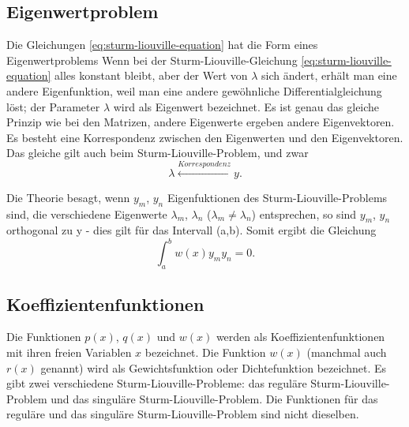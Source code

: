 \subsection{Eigenwertproblem}
Die Gleichungen \ref{eq:sturm-liouville-equation} hat die Form eines Eigenwertproblems
Wenn bei der Sturm-Liouville-Gleichung \ref{eq:sturm-liouville-equation} alles  konstant bleibt, aber der Wert von $\lambda$ sich ändert, erhält man eine andere Eigenfunktion, weil man eine andere gewöhnliche Differentialgleichung löst;
der Parameter $\lambda$ wird als Eigenwert bezeichnet.
Es ist genau das gleiche Prinzip wie bei den Matrizen, andere Eigenwerte ergeben andere Eigenvektoren.
Es besteht eine Korrespondenz zwischen den Eigenwerten und den Eigenvektoren.
Das gleiche gilt auch beim Sturm-Liouville-Problem, und zwar
\begin{equation}
	\lambda \overset{Korrespondenz}\leftrightarrow y.
\end{equation}

Die Theorie besagt, wenn $y_m$, $y_n$ Eigenfuktionen des Sturm-Liouville-Problems sind, die verschiedene Eigenwerte $\lambda_m$, $\lambda_n$ ($\lambda_m \neq \lambda_n$) entsprechen, so sind $y_m$, $y_n$ orthogonal zu y -
dies gilt für das Intervall (a,b).
Somit ergibt die Gleichung
\begin{equation}
	\label{eq:skalar-sturm-liouville}
	\int_{a}^{b} w(x)y_m y_n = 0.
\end{equation}

\subsection{Koeffizientenfunktionen}
Die Funktionen $p(x)$, $q(x)$ und $w(x)$ werden als Koeffizientenfunktionen mit ihren freien Variablen $x$ bezeichnet.
Die Funktion $w(x)$ (manchmal auch $r(x)$ genannt) wird als Gewichtsfunktion oder Dichtefunktion bezeichnet.
Es gibt zwei verschiedene Sturm-Liouville-Probleme: das reguläre Sturm-Liouville-Problem und das singuläre Sturm-Liouville-Problem. 
Die Funktionen für das reguläre und das singuläre Sturm-Liouville-Problem sind nicht dieselben.

%
%

